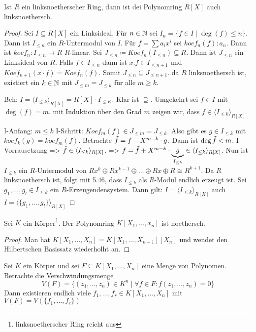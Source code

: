 \documentclass[../main.tex]{subfiles}
\begin{document}
\begin{theorem}
    Ist $R$ ein linksnoetherscher Ring, dann ist dei Polynomring $R[X]$ auch linksnoethersch.
\end{theorem}
\begin{proof}
    Sei $I\subseteq R[X]$ ein Linksideal.
    Für $n\in \mathbb{N}$ sei $I_n = \{f\in I\mid \deg(f)\leq n\}$.
    Dann ist $I_{\leq n}$ ein $R$-Untermodul von $I$.
    Für $f=\sum a_i x^i$ sei $koef_n(f)\colon a_n$.
    Dann ist $koef_n: I_{\leq n} \rightarrow R$ $R$-linear.
    Sei $J_{\leq n} \coloneqq Koef_n(I_{\leq n}) \subseteq R$.
    Dann ist $J_{\leq n}$ ein Linksideal von $R$.
    Falls $f\in I_{\leq n}$ dann ist $x.f\in I_{\leq n+1}$ und $Koef_{n+1}(x\cdot f) = Koef_n(f)$.
    Somit $J_{\leq n}\subseteq J_{\leq n+1}$.
    da $R$ linksnoethersch ist, existiert ein $k\in \mathbb{N}$ mit $J_{\leq m} = J_{\leq k}$ für alle $m\geq k$.

    Beh: $I = \langle I_{\leq k}\rangle_{R[X]} = R[X]\cdot I_{\leq K}$.
    Klar ist $\supseteq$.
    Umgekehrt sei $f\in I$ mit $\deg(f)=m$.
    mit Induktion über den Grad $m$ zeigen wir, dass $f\in \langle I_{\leq k}\rangle_{R[X]}$.

    I-Anfang: $m\leq k$ \checkmark
    I-Schritt: $Koef_m(f)\in J_{\leq m} = J_{\leq k}$.
    Also gibt es $g\in I_{\leq k}$ mit $koef_k(g)=koef_m(f)$.
    Betrachte $\Tilde{f} = f- X^{m-k}\cdot g$.
    Dann ist $\deg \Tilde{f}  < m$.
    I-Vorrausetzung => $\Tilde{f}\in \langle I_{\leq k} \rangle_{R[X]}$.
    => $f = \Tilde{f} + X^{m-k} \cdot \underbrace{g}_{I_{\leq k}} \in \langle I_{\leq k}\rangle_{R[X]}$.
    Nun ist $I_{\leq k}$ ein $R$-Untermodul von $R x^k \oplus Rx^{k-1}\oplus \dots \oplus Rx \oplus R\cong R^{k+1}$.
    Da $R$ linksnoethersch ist, folgt mit 5.46, dass $I_{\leq k}$ als $R$-Modul endlich erzeugt ist.
    Sei $g_1,\dots, g_l\in I_{\leq k}$ ein $R$-Erzeugendensystem.
    Dann gilt: $I=\langle I_{\leq k}\rangle_{R[X]}$ auch $I = \langle\{g_1,\dots,g_l\}\rangle_{R[X]}$
\end{proof}

\begin{corollary}
    Sei $K$ ein Körper\footnote{linksnoetherscher Ring reicht aus}. Der Polynomring $K[X_1,\dots,x_n]$ ist noethersch.
\end{corollary}
\begin{proof}
    Man hat $K[X_1,\dots,X_n] = K[X_1,\dots,X_{n-1}][X_n]$ und wendet den Hilbertschen Basissatz  wiederholht an.
\end{proof}
\begin{corollary} %
    Sei $K$ ein Körper und sei $F\subseteq K[X_1, \dots, X_n]$ eine Menge von Polynomen. Betrachte die Verschwindungsmenge $$V(F) = \{(z_1,\dots,z_n)\in K^n\mid \forall f\in F: f(z_1,\dots,z_n) = 0\}$$
    Dann existieren endlich viele $f_1,\dots,f_r\in K[X_1,\dots,X_n]$ mit $V(F) = V(\{f_1,\dots, f_r\})$
\end{corollary}
\end{document}
